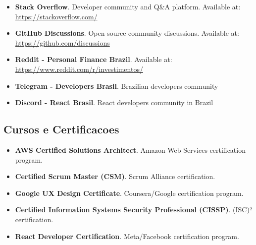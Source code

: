 \begin{itemize}
    \item \textbf{Stack Overflow}. Developer community and Q\&A platform. Available at: \url{https://stackoverflow.com/}
    
    \item \textbf{GitHub Discussions}. Open source community discussions. Available at: \url{https://github.com/discussions}
    
    \item \textbf{Reddit - Personal Finance Brazil}. Available at: \url{https://www.reddit.com/r/investimentos/}
    
    \item \textbf{Telegram - Developers Brasil}. Brazilian developers community
    
    \item \textbf{Discord - React Brasil}. React developers community in Brazil
\end{itemize}

\subsection{Cursos e Certificacoes}

\begin{itemize}
    \item \textbf{AWS Certified Solutions Architect}. Amazon Web Services certification program.
    
    \item \textbf{Certified Scrum Master (CSM)}. Scrum Alliance certification.
    
    \item \textbf{Google UX Design Certificate}. Coursera/Google certification program.
    
    \item \textbf{Certified Information Systems Security Professional (CISSP)}. (ISC)² certification.
    
    \item \textbf{React Developer Certification}. Meta/Facebook certification program.
\end{itemize}
